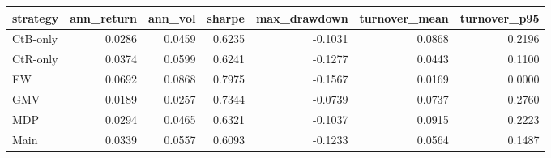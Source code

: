 \begin{tabular}{lrrrrrr}
\toprule
strategy & ann_return & ann_vol & sharpe & max_drawdown & turnover_mean & turnover_p95 \\
\midrule
CtB-only & 0.0286 & 0.0459 & 0.6235 & -0.1031 & 0.0868 & 0.2196 \\
CtR-only & 0.0374 & 0.0599 & 0.6241 & -0.1277 & 0.0443 & 0.1100 \\
EW & 0.0692 & 0.0868 & 0.7975 & -0.1567 & 0.0169 & 0.0000 \\
GMV & 0.0189 & 0.0257 & 0.7344 & -0.0739 & 0.0737 & 0.2760 \\
MDP & 0.0294 & 0.0465 & 0.6321 & -0.1037 & 0.0915 & 0.2223 \\
Main & 0.0339 & 0.0557 & 0.6093 & -0.1233 & 0.0564 & 0.1487 \\
\bottomrule
\end{tabular}
